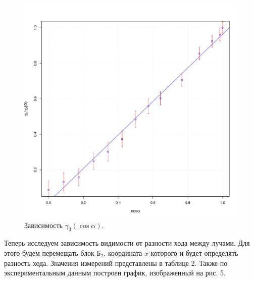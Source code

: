 \documentclass[a4paper,12pt]{article}
\begin{document}
\begin{figure}[H]
\includegraphics[scale=0.4]{g1.pdf}
\centering
\caption{Зависимость $\gamma_3(\cos \alpha)$.}
\end{figure}

\noindent Теперь исследуем зависимость видимости от разности хода между лучами. Для этого будем перемещать блок $\text{Б}_2$, координата $x$ которого и будет определять разность хода. Значения измерений представлены в таблице 2. Также по экспериментальным данным построен график, изображенный на рис. 5.\\
\end{document}
